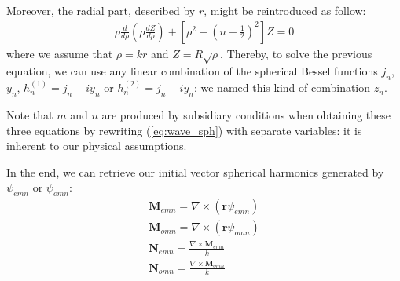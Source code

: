 \documentclass{article}
\numberwithin{equation}{section}
\begin{document}
Moreover, the radial part, described by $r$, might be reintroduced as follow:
\begin{align}
\rho\frac{d }{d\rho}(\rho\frac{d Z}{d\rho})+[\rho^{2}-(n+\frac{1}{2})^{2}]Z=0
\end{align}
where we assume that $\rho=kr$ and $Z=R\sqrt{\rho}$. Thereby, to solve the previous equation, we can use any linear combination of the spherical Bessel functions $j_{n}$, $y_{n}$, $h^{(1)}_{n}=j_{n}+iy_{n}$ or $h^{(2)}_{n}=j_{n}-iy_{n}$: we named this kind of combination $z_{n}$.

Note that $m$ and $n$ are produced by subsidiary conditions when obtaining these three equations by rewriting (\ref{eq:wave_sph}) with separate variables: it is inherent to our physical assumptions.

In the end, we can retrieve our initial vector spherical harmonics generated by $\psi_{emn}$ or $\psi_{omn}$:
\begin{align}
\textbf{M}_{emn}=\nabla \times (\textbf{r}\psi_{emn})\\
\textbf{M}_{omn}=\nabla \times (\textbf{r}\psi_{omn})\\
\textbf{N}_{emn}=\frac{\nabla \times \textbf{M}_{emn}}{k}\\
\textbf{N}_{omn}=\frac{\nabla \times \textbf{M}_{omn}}{k}
\end{align}
\end{document}
